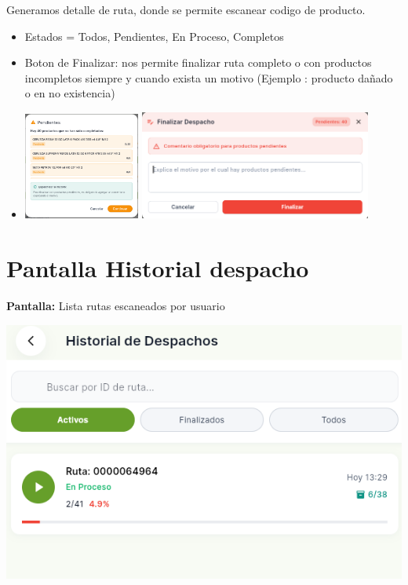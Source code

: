 \documentclass[12pt,a4paper]{report}
\begin{document}
\begin{caracteristicabox}
  Generamos detalle de ruta, donde se permite escanear codigo de producto. 
  \begin{itemize}[leftmargin=*]
    \item Estados = Todos, Pendientes, En Proceso, Completos
    \item Boton de Finalizar: nos permite finalizar ruta completo o con productos incompletos siempre y cuando exista un motivo (Ejemplo : producto dañado o en no existencia)
    \item \includegraphics[width=0.3\textwidth]{pantallas/pendientesP.png} \includegraphics[width=0.6\textwidth]{pantallas/motivoPendiete.png}
\end{itemize}
\end{caracteristicabox}


\section{Pantalla Historial despacho}

\begin{pantallabox}
\textbf{Pantalla:} Lista rutas escaneados por usuario \\
\end{pantallabox}
\includegraphics[width=\textwidth]{pantallas/historialDespacho.png}
\end{document}

